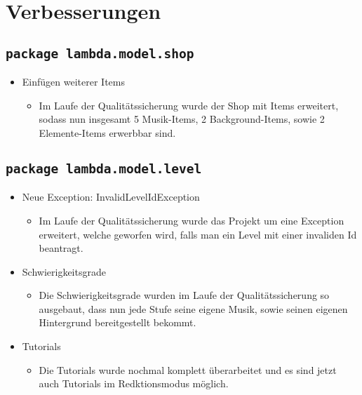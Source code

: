 \section{Verbesserungen}
\subsection{\texttt{package lambda.model.shop}}
\begin{itemize}
\item Einfügen weiterer Items
\begin{itemize} 
\item Im Laufe der Qualitätssicherung wurde der Shop mit Items erweitert, sodass nun insgesamt 5 Musik-Items, 2 Background-Items, sowie 2 Elemente-Items erwerbbar sind.
	\end{itemize}
\end{itemize}

\subsection{\texttt{package lambda.model.level}}
\begin{itemize}
\item Neue Exception: InvalidLevelIdException
\begin{itemize} 
\item Im Laufe der Qualitätssicherung wurde das Projekt um eine Exception erweitert, welche geworfen wird, falls man ein Level mit einer invaliden Id beantragt.
	\end{itemize}
\end{itemize}

\begin{itemize}
\item Schwierigkeitsgrade
\begin{itemize} 
\item Die Schwierigkeitsgrade wurden im Laufe der Qualitätssicherung so ausgebaut, dass nun jede Stufe seine eigene Musik, sowie seinen eigenen Hintergrund bereitgestellt bekommt.
	\end{itemize}
\end{itemize}

\begin{itemize}
\item Tutorials
\begin{itemize} 
\item Die Tutorials wurde nochmal komplett überarbeitet und es sind jetzt auch Tutorials im Redktionsmodus möglich.
	\end{itemize}
\end{itemize}

